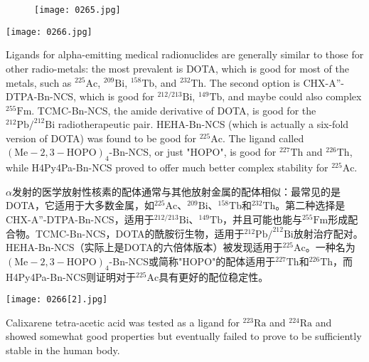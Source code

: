 \documentclass[dvipsnames, svgnames,a4paper,11pt]{article}
\begin{document}
\begin{figure}[h]
	\centering
    \texttt{[image: 0265.jpg]}  
     \label{fig356}
\end{figure}

\begin{figure*}[h]
	\centering
    \texttt{[image: 0266.jpg]}  
\end{figure*}


Ligands for alpha-emitting medical radionuclides are generally similar to those for other radio-metals: the most prevalent is DOTA, which is good for most of the metals, such as \(\mathrm{^{225}Ac}\), \(\mathrm{^{209}Bi}\), \(\mathrm{^{158}Tb}\), and \(\mathrm{^{232}Th}\). The second option is CHX-A''-DTPA-Bn-NCS, which is good for \(\mathrm{^{212/213}Bi}\), \(\mathrm{^{149}Tb}\), and maybe could also complex \(\mathrm{^{255}Fm}\). TCMC-Bn-NCS, the amide derivative of DOTA, is good for the \(\mathrm{^{212}Pb/^{212}Bi}\) radiotherapeutic pair. HEHA-Bn-NCS (which is actually a six-fold version of DOTA) was found to be good for \(\mathrm{^{225}Ac}\). The ligand called \(\mathrm{(Me-2,3-HOPO)}_4\)-Bn-NCS, or just "HOPO", is good for \(\mathrm{^{227}Th}\) and \(\mathrm{^{226}Th}\), while H4Py4Pa-Bn-NCS proved to offer much better complex stability for \(\mathrm{^{225}Ac}\).  

$\alpha$发射的医学放射性核素的配体通常与其他放射金属的配体相似：最常见的是DOTA，它适用于大多数金属，如\(\mathrm{^{225}Ac}\)、\(\mathrm{^{209}Bi}\)、\(\mathrm{^{158}Tb}\)和\(\mathrm{^{232}Th}\)。第二种选择是CHX-A''-DTPA-Bn-NCS，适用于\(\mathrm{^{212/213}Bi}\)、\(\mathrm{^{149}Tb}\)，并且可能也能与\(\mathrm{^{255}Fm}\)形成配合物。TCMC-Bn-NCS，DOTA的酰胺衍生物，适用于\(\mathrm{^{212}Pb/^{212}Bi}\)放射治疗配对。HEHA-Bn-NCS（实际上是DOTA的六倍体版本）被发现适用于\(\mathrm{^{225}Ac}\)。一种名为\(\mathrm{(Me-2,3-HOPO)}_4\)-Bn-NCS或简称"HOPO"的配体适用于\(\mathrm{^{227}Th}\)和\(\mathrm{^{226}Th}\)，而H4Py4Pa-Bn-NCS则证明对于\(\mathrm{^{225}Ac}\)具有更好的配位稳定性。  

\begin{figure*}[h]
	\centering
    \texttt{[image: 0266[2].jpg]}  
\end{figure*}

Calixarene tetra-acetic acid was tested as a ligand for \(\mathrm{^{223}Ra}\) and \(\mathrm{^{224}Ra}\) and showed somewhat good properties but eventually failed to prove to be sufficiently stable in the human body.
\end{document}
